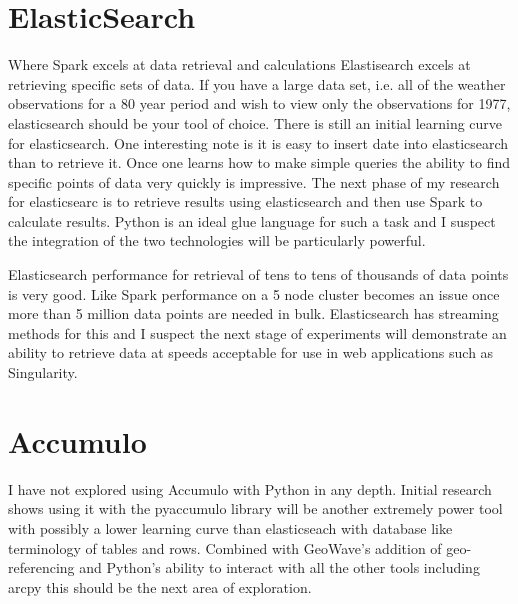 \documentclass[12pt]{article}
\begin{document}
    \section{ElasticSearch}
    Where Spark excels at data retrieval and calculations Elastisearch excels at 
    retrieving specific sets of data.  If you have a large data set, i.e. all of 
    the weather observations for a 80 year period and wish to view only the 
    observations for 1977, elasticsearch should be your tool of choice.  There 
    is still an initial learning curve for elasticsearch.  One interesting note 
    is it is easy to insert date into elasticsearch than to retrieve it.  Once 
    one learns how to make simple queries the ability to find specific points of 
    data very quickly is impressive.  The next phase of my research for 
    elasticsearc is to retrieve results using elasticsearch and then use Spark 
    to calculate results.  Python is an ideal glue language for such a task and 
    I suspect the integration of the two technologies will be particularly 
    powerful.

    Elasticsearch performance for retrieval of tens to tens of thousands of data 
    points is very good.  Like Spark performance on a 5 node cluster becomes an 
    issue once more than 5 million data points are needed in bulk.  
    Elasticsearch has streaming methods for this and I suspect the next stage of 
    experiments will demonstrate an ability to retrieve data at speeds 
    acceptable for use in web applications such as Singularity.

    \section{Accumulo}
    I have not explored using Accumulo with Python in any depth.  Initial 
    research shows using it with the pyaccumulo library will be another 
    extremely power tool with possibly a lower learning curve than elasticseach 
    with database like terminology of tables and rows.  Combined with GeoWave's 
    addition of geo-referencing and Python's ability to interact with all the 
    other tools including arcpy this should be the next area of exploration.
\end{document}
